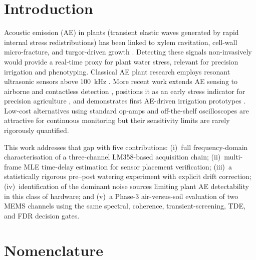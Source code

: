 \documentclass[10pt,a4paper,twocolumn]{article}
\begin{document}
\section{Introduction}

Acoustic emission (AE) in plants (transient elastic waves generated by rapid internal stress redistributions) has been linked to xylem cavitation, cell-wall micro-fracture, and turgor-driven growth \citep{Milburn1966,Tyree1983,Zweifel2012}. Detecting these signals non-invasively would provide a real-time proxy for plant water stress, relevant for precision irrigation and phenotyping. Classical AE plant research employs resonant ultrasonic sensors above \SI{100}{\kilo\hertz} \citep{Cochard1992,Nardini2015,DeRoo2016}. More recent work extends AE sensing to airborne and contactless detection \citep{Khait2023,Bonisoli2025,Klaminder2025}, positions it as an early stress indicator for precision agriculture \citep{Oletic2020,Kiraly2025,Saha2026}, and demonstrates first AE-driven irrigation prototypes \citep{Oletic2023,Simbeye2023}. Low-cost alternatives using standard op-amps and off-the-shelf oscilloscopes are attractive for continuous monitoring but their sensitivity limits are rarely rigorously quantified.

This work addresses that gap with five contributions: (i)~full frequency-domain characterisation of a three-channel LM358-based acquisition chain; (ii)~multi-frame MLE time-delay estimation for sensor placement verification; (iii)~a statistically rigorous pre--post watering experiment with explicit drift correction; (iv)~identification of the dominant noise sources limiting plant AE detectability in this class of hardware; and (v)~a Phase-3 air-versus-soil evaluation of two MEMS channels using the same spectral, coherence, transient-screening, TDE, and FDR decision gates.

\section{Nomenclature}
\end{document}
